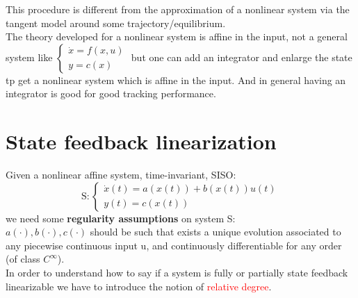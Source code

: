 \begin{remark}
		This procedure is different from the approximation of a nonlinear system via the tangent model around some trajectory/equilibrium.\\
		The theory developed for a nonlinear system is affine in the input, not a general system like $\begin{cases}
			\dot{x}=f(x,u)\\y=c(x)
		\end{cases}$ but one can add an integrator and enlarge the state tp get a nonlinear system which is affine in the input. And in general having an integrator is good for good tracking performance.

\end{remark}
\section{State feedback linearization}
Given a nonlinear affine system, time-invariant, SISO:
\[\text{S}: \begin{cases}
	\dot{x}(t)=a(x(t))+b(x(t))u(t)\\
	y(t)=c(x(t))
\end{cases}
\] we need some \textbf{regularity assumptions} on system S:\\ $a(\cdot),b(\cdot),c(\cdot)$ should be such that exists a unique evolution associated to any piecewise continuous input u, and continuously differentiable for any order (of class $C^\infty$). \\
In order to understand how to say if a system is fully or partially state feedback linearizable we have to introduce the notion of \textcolor{red}{relative degree}.
